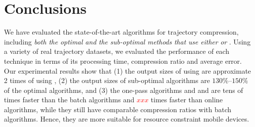 \section{Conclusions}

We have evaluated the state-of-the-art \lsa algorithms for trajectory compression, including \emph{both the optimal and the sub-optimal methods that use either \ped or \sed}. 
Using a variety of real trajectory datasets, we evaluated the performance of each technique in terms of its processing time, compression ratio and average error.
Our experimental results show that (1) the output sizes of using \sed are approximate 2 times of using \ped, (2) the output sizes of sub-optimal algorithms are $130\%$--$150\%$ of the optimal algorithms, and (3) the one-pass algorithms \siped and \operb and \cised are tens of times faster than the batch algorithms and \textcolor{red}{$xxx$} times faster than online algorithms, while they still have comparable compression ratios with batch algorithms. 
Hence, they are more suitable for resource constraint mobile devices.
